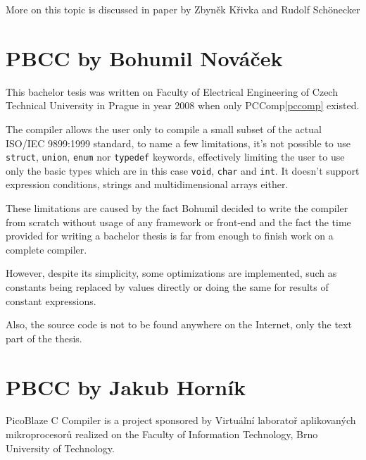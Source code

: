     More on this topic is discussed in paper by Zbyněk Křivka and Rudolf Schönecker %


    \section{PBCC by Bohumil Nováček}\label{not_quite_c}
    
    This bachelor tesis was written on Faculty of Electrical Engineering of Czech Technical University in Prague in year 2008 when only PCComp\ref{pccomp} existed.
    
    The compiler allows the user only to compile a 
    small subset of the actual ISO/IEC 9899:1999 standard,
    to name a few limitations, it's not possible to use 
    \texttt{struct}, \texttt{union}, \texttt{enum} nor \texttt{typedef} keywords,
    effectively limiting the user to use only the basic types which are in this case \texttt{void}, \texttt{char} and \texttt{int}.
    It doesn't support expression conditions, strings and multidimensional arrays either.
    
    These limitations are caused by the fact Bohumil decided to write the compiler 
    from scratch without usage of any framework or front-end and the fact the time provided
    for writing a bachelor thesis is far from enough to finish work on a complete compiler.
    
    However, despite its simplicity, some optimizations are implemented, 
    such as constants being replaced by values directly or 
    doing the same for results of constant expressions.
    
    Also, the source code is not to be found anywhere on the Internet, only the text part of the thesis.
    

    \section{PBCC by Jakub Horník}\label{prev_pbcc}


    PicoBlaze C Compiler is a project sponsored by Virtuální laboratoř aplikovaných mikroprocesorů %
    realized on the Faculty of Information Technology, Brno University of Technology.

